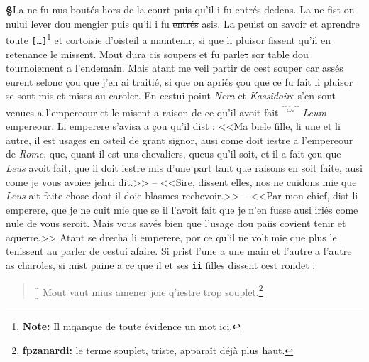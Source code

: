\documentclass[12pt]{article} %
\newcommand{\persName}[1]{\emph{#1}} %
\newcommand{\placeName}[1]{\emph{#1}} %
\newcommand{\num}[1]{\texttt{#1}}    %
\newcommand{\add}[1]{\textsuperscript{#1}}       %
\newcommand{\missing}{\texttt{[\ldots]}}     %
\newcommand{\fnnote}[1]{\footnote{\textbf{Note:} #1}} %
\newcommand{\fnfpz}[1]{\footnote{\textbf{fpzanardi:} #1}} %
\newcommand{\del}[1]{\sout{#1}}      %
\newcounter{paranum}
\newcommand{\pnum}{\stepcounter{paranum}\textbf{§\arabic{paranum}}\quad}
\begin{document}
\pnum La ne fu nus boutés hors de la court puis qu'il i fu entrés dedens. La ne fist on nului lever dou mengier puis qu'il i fu \del{entrés} asis. La peuist on savoir et aprendre toute \missing\fnnote{Il mqanque de toute évidence un mot ici.} et cortoisie d'oisteil a maintenir, si que li pluisor fissent qu'il en retenance le missent. Mout dura cis soupers et fu parle\del{t} sor table dou tournoiement a l'endemain. Mais atant me veil partir de cest souper car assés eurent selonc çou que j'en ai traitié, si que on apriés çou que ce fu fait li pluisor se sont mis et mises au caroler. En cestui point \persName{Nera} et \persName{Kassidoire} s'en sont venues a l'empereour et le misent a raison de ce qu'il avoit fait \add{^de^} \persName{Leum} \del{empereour}. Li emperere s'avisa a çou qu'il dist : <<Ma biele fille, li une et li autre, il est usages en osteil de grant signor, ausi come doit iestre a l'empereour de \placeName{Rome}, que, quant il est uns chevaliers, queus qu'il soit, et il a fait çou que \persName{Leus} avoit fait, que il doit iestre mis d'une part tant que raisons en soit faite, ausi come je vous avoie\del{e} jehui dit.>> -- <<Sire, dissent elles, nos ne cuidons mie que \persName{Leus} ait faite chose dont il doie blasmes rechevoir.>> -- <<Par mon chief, dist li emperere, que je ne cuit mie que se il l'avoit fait que je n'en fusse ausi iriés come nule de vous seroit. Mais vous savés bien que l'usage dou paiis covient tenir et aquerre.>> Atant se drecha li emperere, por ce qu'il ne volt mie que plus le tenissent au parler de cestui afaire. Si prist l'une a une main et l'autre a l'autre as charoles, si mist paine a ce que il et ses \num{ii} filles dissent cest rondet :
\begin{verse}[\versewidth]
Mout vaut mius amener joie q'iestre trop souplet.\fnfpz{le terme souplet, triste, apparaît déjà plus haut.}
\end{verse}
\end{document}
